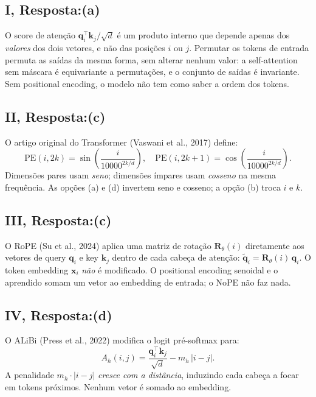 \documentclass{dlproblemset}
\begin{document}
\subsection*{I, Resposta:(a)}
O score de atenção $\mathbf{q}_i^\top \mathbf{k}_j / \sqrt{d}$ é um produto interno
que depende apenas dos \emph{valores} dos dois vetores, e não das posições $i$ ou $j$.
Permutar os tokens de entrada permuta as saídas da mesma forma, sem alterar nenhum
valor: a self-attention sem máscara é equivariante a permutações, e o conjunto de saídas
é invariante. Sem positional encoding, o modelo não tem como saber a ordem dos tokens.

\subsection*{II, Resposta:(c)}
O artigo original do Transformer (Vaswani et al., 2017) define:
\[
  \mathrm{PE}(i, 2k)   = \sin\!\left(\frac{i}{10000^{2k/d}}\right),\quad
  \mathrm{PE}(i, 2k+1) = \cos\!\left(\frac{i}{10000^{2k/d}}\right).
\]
Dimensões pares usam \emph{seno}; dimensões ímpares usam \emph{cosseno} na mesma
frequência. As opções (a) e (d) invertem seno e cosseno; a opção (b) troca $i$ e $k$.

\subsection*{III, Resposta:(c)}
O RoPE (Su et al., 2024) aplica uma matriz de rotação $\mathbf{R}_\theta(i)$ diretamente aos
vetores de query $\mathbf{q}_i$ e key $\mathbf{k}_j$ dentro de cada cabeça de atenção:
$\tilde{\mathbf{q}}_i = \mathbf{R}_\theta(i)\,\mathbf{q}_i$.
O token embedding $\mathbf{x}_i$ \emph{não} é modificado.
O positional encoding senoidal e o aprendido somam um vetor ao embedding de entrada;
o NoPE não faz nada.

\subsection*{IV, Resposta:(d)}
O ALiBi (Press et al., 2022) modifica o logit pré-softmax para:
\[
  A_h(i, j) = \frac{\mathbf{q}_i^\top \mathbf{k}_j}{\sqrt{d}} - m_h\,|i - j|.
\]
A penalidade $m_h \cdot |i-j|$ \emph{cresce com a distância}, induzindo cada cabeça
a focar em tokens próximos. Nenhum vetor é somado ao embedding.

\end{document}
